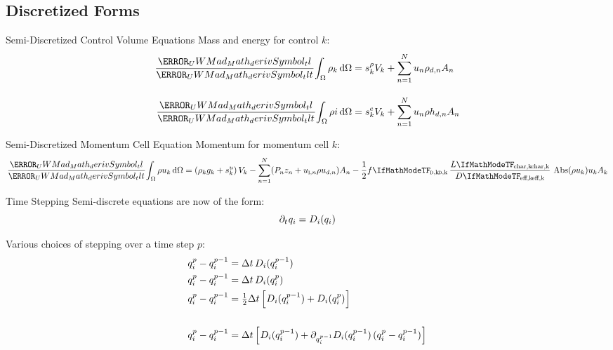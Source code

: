 \documentclass[10pt,t,xcolor=table,compress]{UWMadBeamer}
\begin{document}
    \subsection*{Discretized Forms}
    \begin{frame}{Semi-Discretized Control Volume Equations}
        Mass and energy for control $k$:
        \begin{align}
            \deriv{}{t}\!\IntV \rho_k \dV  &= s^\rho_k V_k + \sum_{n=1}^{N} u_n \rho_{d,n} A_n \\[1em]
            \deriv{}{t}\! \IntV \rho i \dV &= s^e_k V_k + \sum_{n=1}^{N} u_n \rho{h}_{d,n} A_n
        \end{align}
    \end{frame}
    
    
    \begin{frame}{Semi-Discretized Momentum Cell Equation}
        Momentum for momentum cell $k$:
        \begin{equation}
            \deriv{}{t}\! \IntV \rho u_k \dV = 
                (\rho_k g_k + s^u_k)\,V_k 
                - \sum_{n=1}^{N}   (P_n z_n +  u_{\text{\textsc{i}},n} \rho{u}_{d,n}) A_n 
                - \frac{1}{2} f\subs{\textsc{d},k}\,\frac{L\subs{char,k}}{D\subs{eff,k}}\,\Abs(\rho{u}_k) u_k A_k
        \end{equation}
    \end{frame}
    
    
    
    \begin{frame}{Time Stepping}
        Semi-discrete equations are now of the form:
        \begin{equation}
            \partial_t\:\! q_i = D_i(q_i)
        \end{equation}
        
        Various choices of stepping over a time step $p$:
        \begin{align}
            \qi^{p} - \qi^{p-1} &= \Delta{t}\,D_i(\qi^{p-1}) \\
            \qi^{p} - \qi^{p-1} &= \Delta{t}\,D_i(\qi^{p}) \\
            \qi^{p} - \qi^{p-1} &= \tfrac{1}{2}\Delta{t}\,\left[D_i(\qi^{p-1}) + D_i(\qi^{p})\right] \\[1.5em]
            \qi^{p} - \qi^{p-1} &= \Delta{t}\,\left[D_i(\qi^{p-1}) + \partial_{\qi^{p-1}}D_i(\qi^{p-1})\,(\qi^{p} - \qi^{p-1})\right]
        \end{align}
    \end{frame}
\end{document}
